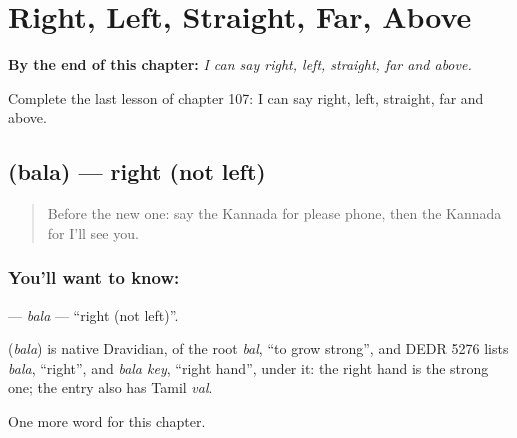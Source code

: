 
\chapter{Right, Left, Straight, Far, Above}
\label{ch:ka-right-left-straight-far-above}

\begin{chapteropening}
\textbf{By the end of this chapter:} \emph{I can say right, left, straight, far and above.}

Complete the last lesson of chapter 107: I can say right, left, straight, far and above.
\end{chapteropening}

\section[\texorpdfstring{\kn{ಬಲ} (bala)}{ಬಲ (bala)}]{ (bala) — right (not left)}

\label{lesson:KA-C107-bala}



\begin{quote}
Before the new one: say the Kannada for please phone, then the Kannada for I'll see you.
\end{quote}

\subsection*{You'll want to know: }
\textbf{} — \emph{bala} — \textquotedblleft{}right (not left)\textquotedblright{}.

\begin{cousinweb}
\textbf{} (\emph{bala}) is native Dravidian, of the root \emph{bal}, \textquotedblleft{}to grow strong\textquotedblright{}, and DEDR 5276 lists \emph{bala}, \textquotedblleft{}right\textquotedblright{}, and \emph{bala key}, \textquotedblleft{}right hand\textquotedblright{}, under it: the right hand is the strong one; the entry also has Tamil \emph{val}.
\end{cousinweb}

\begin{grammarlens}[title={What you've built}]
One more word for this chapter.
\end{grammarlens}

